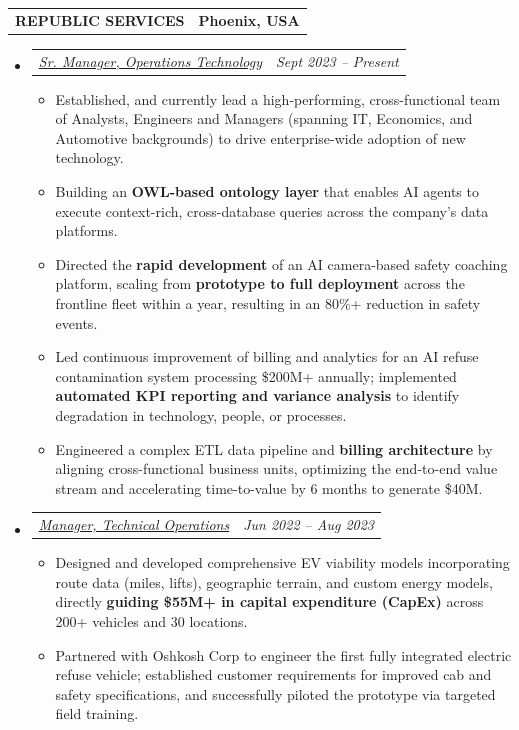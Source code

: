 \documentclass[letterpaper,11pt]{article}
\makeatletter
\newcommand{\resumeItem}[1]{
  \item\small{
    {#1 \vspace{-2pt}}
  }
}
\newcommand{\resumeSubheading}[2]{
  \vspace{-2pt}\item
    \begin{tabular*}{1.0\textwidth}[t]{l@{\extracolsep{\fill}}r}
      \textbf{\large#1} & \textbf{\small #2} \\

    \end{tabular*}\vspace{-7pt}
}
\newcommand{\resumeSubSubheading}[2]{
  \vspace{-2pt}\item
    \begin{tabular*}{1.0\textwidth}[t]{l@{\extracolsep{\fill}}r}
      \textit{\large#1} & \textit{\small #2} \\

    \end{tabular*}\vspace{-1pt}
}
\newcommand{\resumeSubSubHeadingListStart}{\begin{itemize}[leftmargin=0.0in, label={}]}
\newcommand{\resumeSubSubHeadingListEnd}{\end{itemize}}
\newcommand{\resumeItemListStart}{\begin{itemize}[label=$\bullet$]}
\newcommand{\resumeItemListEnd}{\end{itemize}\vspace{-1pt}}
\makeatother
\begin{document}
{    \resumeSubheading
    {REPUBLIC SERVICES}{Phoenix, USA}
    \resumeSubSubHeadingListStart
      \resumeSubSubheading
        {\underline{Sr. Manager, Operations Technology}}{Sept 2023 -- Present}
      \resumeItemListStart
        \resumeItem{\normalsize{Established, and currently lead a high-performing, cross-functional team of Analysts, Engineers and Managers (spanning IT, Economics, and Automotive backgrounds) to drive enterprise-wide adoption of new technology.}}
        \resumeItem{\normalsize{Building an \textbf{OWL-based ontology layer} that enables AI agents to execute context-rich, cross-database queries across the company's data platforms.}}
        \resumeItem{\normalsize{Directed the \textbf{rapid development} of an AI camera-based safety coaching platform, scaling from \textbf{prototype to full deployment} across the frontline fleet within a year, resulting in an 80\%+ reduction in safety events.}}
        \resumeItem{\normalsize{Led continuous improvement of billing and analytics for an AI refuse contamination system processing \$200M+ annually; implemented \textbf{automated KPI reporting and variance analysis} to identify degradation in technology, people, or processes.}}
        \resumeItem{\normalsize{Engineered a complex ETL data pipeline and \textbf{billing architecture} by aligning cross-functional business units, optimizing the end-to-end value stream and accelerating time-to-value by 6 months to generate \$40M.}}
      \resumeItemListEnd

      \resumeSubSubheading
        {\underline{Manager, Technical Operations}}{Jun 2022 -- Aug 2023}
      \resumeItemListStart
        \resumeItem{\normalsize{Designed and developed comprehensive EV viability models incorporating route data (miles, lifts), geographic terrain, and custom energy models, directly \textbf{guiding \$55M+ in capital expenditure (CapEx)} across 200+ vehicles and 30 locations.}}
        \resumeItem{\normalsize{Partnered with Oshkosh Corp to engineer the first fully integrated electric refuse vehicle; established customer requirements for improved cab and safety specifications, and successfully piloted the prototype via targeted field training.}}
      \resumeItemListEnd
    \resumeSubSubHeadingListEnd

}
\end{document}
